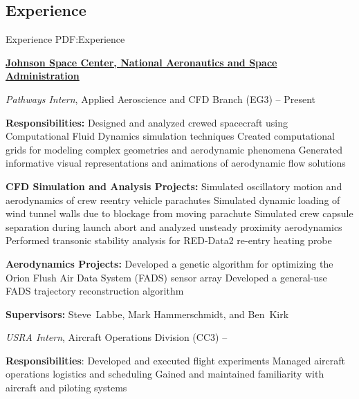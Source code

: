 \documentclass[letterpaper,MMMyyyy,nonstop]{simpleresumecv}
\begin{document}
\begin{body}

\section
{Experience}
{Experience}
{PDF:Experience}

\href{https://www.nasa.gov/centers/johnson/home/index.html}
{\textbf{Johnson Space Center,
National Aeronautics and Space Administration}}

\GapNoBreak
\BulletItem
\emph{Pathways Intern}, Applied Aeroscience and CFD Branch (EG3)
\hfill
{} --
Present
\begin{detail}
\SubItem
\textbf{Responsibilities:}
\SubBulletItem
Designed and analyzed crewed spacecraft using Computational Fluid Dynamics simulation techniques
\SubBulletItem
Created computational grids for modeling complex geometries and aerodynamic phenomena
\SubBulletItem
Generated informative visual representations and animations of aerodynamic flow solutions

\SubItem
\textbf{CFD Simulation and Analysis Projects:}
\SubBulletItem
Simulated oscillatory motion and aerodynamics of crew reentry vehicle parachutes
\SubBulletItem
Simulated dynamic loading of wind tunnel walls due to blockage from moving parachute
\SubBulletItem
Simulated crew capsule separation during launch abort and analyzed unsteady proximity aerodynamics
\SubBulletItem
Performed transonic stability analysis for RED-Data2 re-entry heating probe

\SubItem
\textbf{Aerodynamics Projects:}
\SubBulletItem
Developed a genetic algorithm for optimizing the Orion Flush Air Data System (FADS) sensor array
\SubBulletItem
Developed a general-use FADS trajectory reconstruction algorithm

\SubItem
\textbf{Supervisors:}
Steve~Labbe, Mark Hammerschmidt, and
Ben~Kirk
\end{detail}

\GapNoBreak
\BulletItem
\emph{USRA Intern}, Aircraft Operations Division (CC3)
\hfill
{} --
\begin{detail}
\SubItem
\textbf{Responsibilities}:
\SubBulletItem
Developed and executed flight experiments
\SubBulletItem
Managed aircraft operations logistics and scheduling
\SubBulletItem
Gained and maintained familiarity with aircraft and piloting systems


\end{detail}
\end{body}
\end{document}
